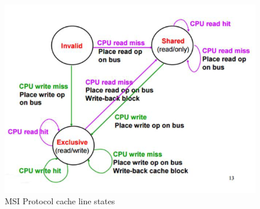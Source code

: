 			\begin{figure}[H]\centering
				\includegraphics[scale=0.5]{./pictures/MSIProtocol.png}
				\caption{MSI Protocol cache line states}
			\end{figure}